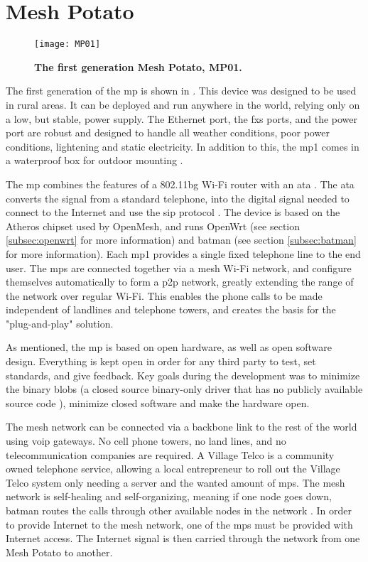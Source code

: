 \section{Mesh Potato}

\begin{figure}[b]
  \centering
      \texttt{[image: MP01]}
  \caption [MP01]{\textbf{The first generation Mesh Potato, MP01.}}
  \label{fig:MP01}
\end{figure}

The first generation of the \gls{mp} is shown in . This device was designed to be used in rural areas. It can be deployed and run anywhere in the world, relying only on a low, but stable, power supply. The Ethernet port, the \gls{fxs} ports, and the power port are robust and designed to handle all weather conditions, poor power conditions, lightening and static electricity. In addition to this, the \gls{mp1} comes in a waterproof box for outdoor mounting \cite{background}.

The \gls{mp} combines the features of a 802.11bg Wi-Fi router with an \gls{ata} \cite{MP}. The \gls{ata} converts the signal from a standard telephone, into the digital signal needed to connect to the Internet and use the \gls{sip} protocol \cite{MParticle}. The device is based on the Atheros chipset used by OpenMesh, and runs OpenWrt (see section \ref{subsec:openwrt} for more information) and \gls{batman} (see section \ref{subsec:batman} for more information). Each \gls{mp1} provides a single fixed telephone line to the end user. The \glspl{mp} are connected together via a mesh Wi-Fi network, and configure themselves automatically to form a \gls{p2p} network, greatly extending the range of the network over regular Wi-Fi. This enables the phone calls to be made independent of landlines and telephone towers, and creates the basis for the "plug-and-play" solution. 

As mentioned, the \gls{mp} is based on open hardware, as well as open software design. Everything is kept open in order for any third party to test, set standards, and give feedback. Key goals during the development was to minimize the binary blobs (a closed source binary-only driver that has no publicly available source code \cite{binaryBolb}), minimize closed software and make the hardware open. 

The mesh network can be connected via a backbone link to the rest of the world using \gls{voip} gateways. No cell phone towers, no land lines, and no telecommunication companies are required. A Village Telco is a community owned telephone service, allowing a local entrepreneur to roll out the Village Telco system only needing a server and the wanted amount of \glspl{mp}. The mesh network is self-healing and self-organizing, meaning if one node goes down, \gls{batman} routes the calls through other available nodes in the network \cite{MPbyRowe}. In order to provide Internet to the mesh network, one of the \glspl{mp} must be provided with Internet access. The Internet signal is then carried through the network from one Mesh Potato to another. 


